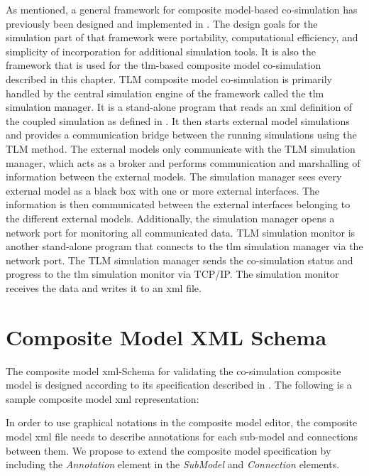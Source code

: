 As men\-tioned, a gen\-eral frame\-work for com\-pos\-ite model-based co-simulation has pre\-vi\-ously 
been de\-signed and im\-ple\-mented in  \cite{tlmalexander05}. The design goals for the simulation part of that framework
were portability, computational efficiency, and simplicity of incorporation for additional simulation tools. 
It is also the framework that is used for the \acrshort{tlm}-based composite model co-simulation described in this chapter.
TLM composite model co-simulation is primarily handled by the central simulation engine of the framework 
called the \acrshort{tlm} simulation manager. It is a stand-alone program that reads an \acrshort{xml} definition
of the coupled simulation as defined in \cite{tlmalexander05}. It then starts external model simulations and
provides a communication bridge between the running simulations using the TLM \cite{tlmlakov06} method. 
The external models only communicate with the TLM simulation manager, which acts as a broker and
performs communication and marshalling of information between the external models. The
simulation manager sees every external model as a black box with one or more external interfaces. The
information is then communicated between the external interfaces belonging to the different external models.
Additionally, the simulation manager opens a network port for monitoring all communicated data.
TLM simulation monitor is another stand-alone program that connects to the \acrshort{tlm} simulation manager via the network port. 
The TLM simulation manager sends the co-simulation status and progress to the \acrshort{tlm}
simulation monitor via TCP/IP. The simulation monitor receives the data and writes it to an \acrshort{xml} file.

\section{Composite Model XML Schema}
\label{sec:tlmschema}

The composite model \acrshort{xml}-Schema for validating the co-simulation composite model is designed according
to its specification described in \cite{tlmalexander05}. The following is a sample composite model \acrshort{xml} representation:



In order to use graphical notations in the composite model editor, the composite model \acrshort{xml} file needs to describe annotations for each sub-model and connections between them. We propose to extend the composite model specification by including the \textit{Annotation}  element in the \textit{SubModel} and \textit{Connection} elements.


